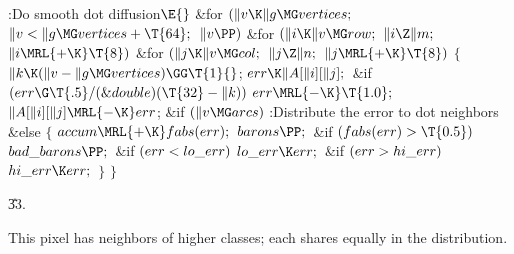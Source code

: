 \Y\B\4:Do smooth dot diffusion\X${}\E{}$\6
\&{for} ${}(\|v\K\|g\MG\\{vertices};{}$ ${}\|v<\|g\MG\\{vertices}+\T{64};{}$
${}\|v\PP){}$\1\6
\&{for} ${}(\|i\K\|v\MG\\{row};{}$ ${}\|i\Z\|m;{}$ ${}\|i\MRL{+{\K}}\T{8}){}$\1%
\6
\&{for} ${}(\|j\K\|v\MG\\{col};{}$ ${}\|j\Z\|n;{}$ ${}\|j\MRL{+{\K}}\T{8}){}$\5
${}\{{}$\1\6
${}\|k\K(\|v-\|g\MG\\{vertices})\GG\T{1}{}$;\6
${}\\{err}\K\|A[\|i][\|j];{}$\6
\&{if} ${}(\\{err}\G\T{.5}/(\&{double})(\T{32}-\|k)){}$\1\5
${}\\{err}\MRL{-{\K}}\T{1.0};{}$\2\6
${}\|A[\|i][\|j]\MRL{-{\K}}\\{err}{}$;\6
\&{if} ${}(\|v\MG\\{arcs}){}$\1\5
:Distribute the error to dot neighbors\X\2\6
\&{else}\5
${}\{{}$\1\6
${}\\{accum}\MRL{+{\K}}\\{fabs}(\\{err});{}$\6
${}\\{barons}\PP;{}$\6
\&{if} ${}(\\{fabs}(\\{err})>\T{0.5}){}$\1\5
${}\\{bad\_barons}\PP;{}$\2\6
\&{if} ${}(\\{err}<\\{lo\_err}){}$\1\5
${}\\{lo\_err}\K\\{err};{}$\2\6
\&{if} ${}(\\{err}>\\{hi\_err}){}$\1\5
${}\\{hi\_err}\K\\{err};{}$\2\6
\4${}\}{}$\2\6
\4${}\}{}$\2\2\2\par
\U33.\fi

This pixel has  neighbors of higher
classes; each shares equally
in the distribution.

